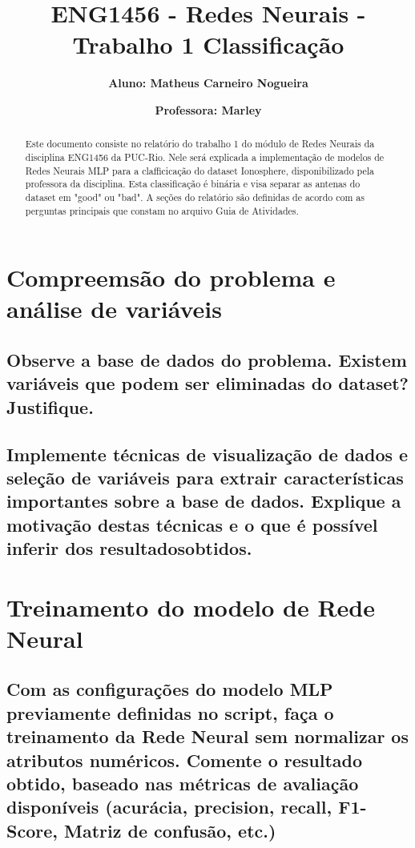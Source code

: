 \documentclass[12pt]{article}
\title{\textbf{ENG1456 - Redes Neurais - Trabalho 1 Classificação}}
\author{\textbf{Aluno: Matheus Carneiro Nogueira}}
\affil{}
\author{\textbf{Professora: Marley}}
\affil{}
\date{}
\begin{document}
	\maketitle
	\tableofcontents
	
\begin{abstract}
	Este documento consiste no relatório do trabalho 1 do módulo de Redes Neurais da disciplina ENG1456 da PUC-Rio. Nele será explicada a implementação de modelos de Redes Neurais MLP para a clafficicação do dataset Ionosphere, disponibilizado pela professora da disciplina. Esta classificação é binária e visa separar as antenas do dataset em "good" ou "bad". A seções do relatório são definidas de acordo com as perguntas principais que constam no arquivo Guia de Atividades.
\end{abstract}

\section{Compreemsão do problema e análise de variáveis}

\subsection{Observe a base de dados do problema. Existem variáveis que podem ser	eliminadas do dataset? Justifique.}

\subsection{Implemente técnicas de visualização de dados e seleção de variáveis para extrair características importantes sobre a base de dados. Explique	a motivação destas técnicas e o que é possível inferir dos resultadosobtidos.}


\section{Treinamento do modelo de Rede Neural}

\subsection{Com as configurações do modelo MLP previamente definidas no script, faça o treinamento da Rede Neural sem normalizar os atributos	numéricos. Comente o resultado obtido, baseado nas métricas de	avaliação disponíveis (acurácia, precision, recall, F1-Score, Matriz de	confusão, etc.)}
\end{document}
